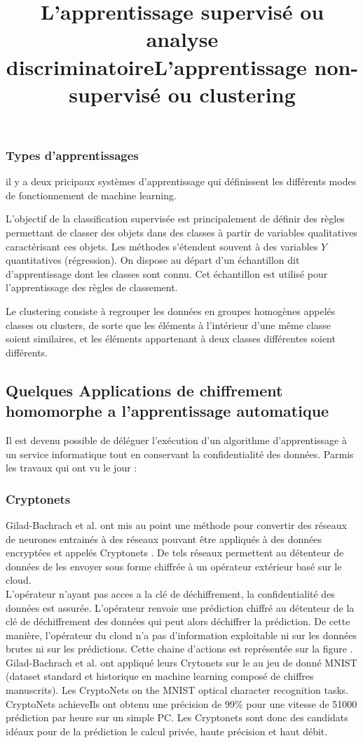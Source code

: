 \documentclass[a4paper,12pt]{article}
\begin{document}
\subsubsection{Types d'apprentissages}
il y a deux pricipaux systèmes d'apprentissage qui définissent les différents modes de fonctionnement de machine learning.\newline
\title{\textbf{L’apprentissage supervisé ou analyse discriminatoire}}\newline
L'objectif de la classification supervisée est principalement de définir des règles permettant de classer des objets dans des classes
à partir de variables qualitatives caractérisant ces objets. Les méthodes s'étendent souvent à des variables $Y$ quantitatives (régression).
On dispose au départ d'un échantillon dit d'apprentissage dont les classes sont connu. Cet échantillon est utilisé pour l'apprentissage des règles de classement.\newline 
\title{\textbf{L’apprentissage non-supervisé ou clustering}}\newline
Le clustering consiste à regrouper les données en groupes homogènes appelés classes ou clusters, de sorte que les éléments à l’intérieur d’une même classe soient similaires, et les éléments appartenant à deux classes différentes soient différents.  

\subsection{Quelques Applications de chiffrement homomorphe a l'apprentissage automatique}
Il est devenu possible de déléguer l'exécution d'un algorithme d'apprentissage à un service informatique tout en conservant la confidentialité des données. \newline
Parmis les travaux qui ont vu le jour  :\newline
\subsubsection{Cryptonets \cite{1gilad2016cryptonets} }
Gilad-Bachrach et al. ont mis au point une méthode pour convertir des réseaux de neurones entrainés à des réseaux pouvant être appliqués à des données encryptées et appelés Cryptonets .
De tels réseaux permettent au détenteur de données de les envoyer sous forme chiffrée à un opérateur extérieur basé sur le cloud.\\
L'opérateur n'ayant pas acces a la clé de déchiffrement, la confidentialité des données est assurée.
L'opérateur renvoie une prédiction chiffré au détenteur de la clé de déchiffrement des données qui peut alors déchiffrer la prédiction. De cette manière, l'opérateur du cloud n'a pas d'information exploitable ni sur les données brutes ni sur les prédictions. Cette chaine d'actions est représentée sur la figure . 
Gilad-Bachrach et al.  ont appliqué leurs Crytonets sur le au jeu de donné MNIST (dataset standard et historique en machine learning composé de chiffres manuscrits).
Les CryptoNets
on the MNIST optical character recognition tasks. CryptoNets achieveIls ont obtenu une précision de 99\% pour une vitesse de 51000 prédiction par heure sur un simple PC. Les Cryptonets sont donc des candidats idéaux pour de la prédiction le calcul privée, haute précision et haut débit.
\end{document}
